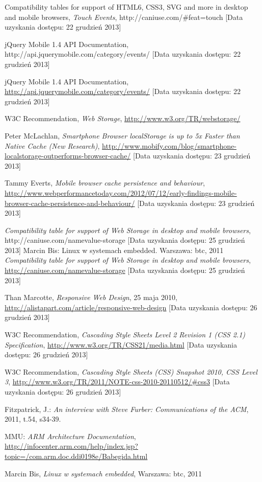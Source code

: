 \begin{thebibliography}{1}
   Compatibility tables for support of HTML6, CSS3, SVG and more in desktop and mobile browsers, {\em Touch Events}, http://caniuse.com/\#feat=touch [Data uzyskania dostępu: 22 grudzień 2013]
  
   jQuery Mobile 1.4 API Documentation, http://api.jquerymobile.com/category/events/ [Data uzyskania dostępu: 22 grudzień 2013]
  
   jQuery Mobile 1.4 API Documentation, \url{http://api.jquerymobile.com/category/events/} [Data uzyskania dostępu: 22 grudzień 2013]
  
   W3C Recommendation, {\em Web Storage}, \url{http://www.w3.org/TR/webstorage/}
  
   Peter McLachlan, \emph{Smartphone Browser localStorage is up to 5x Faster than Native Cache (New Research)}, \url{http://www.mobify.com/blog/smartphone-localstorage-outperforms-browser-cache/} [Data uzyskania dostępu: 23 grudzień 2013]

   Tammy Everts, \emph{Mobile browser cache persistence and behaviour}, \url{http://www.webperformancetoday.com/2012/07/12/early-findings-mobile-browser-cache-persistence-and-behaviour/} [Data uzyskania dostępu: 23 grudzień 2013]

   \emph{Compatibility table for support of Web Storage in desktop and mobile browsers}, http://caniuse.com/namevalue-storage [Data uzyskania dostępu: 25 grudzień 2013]
  Marcin Bis: Linux w systemach embedded. Warszawa: btc, 2011
   \emph{Compatibility table for support of Web Storage in desktop and mobile browsers}, \url{http://caniuse.com/namevalue-storage} [Data uzyskania dostępu: 25 grudzień 2013]
  
   Than Marcotte, \emph{Responsive Web Design}, 25 maja 2010, \url{http://alistapart.com/article/responsive-web-design} [Data uzyskania dostępu: 26 grudzień 2013]

   W3C Recommendation, \emph{Cascading Style Sheets Level 2 Revision 1 (CSS 2.1) Specification}, \url{http://www.w3.org/TR/CSS21/media.html} [Data uzyskania dostępu: 26 grudzień 2013]

   W3C Recommendation, \emph{Cascading Style Sheets (CSS) Snapshot 2010, CSS Level 3}, \url{http://www.w3.org/TR/2011/NOTE-css-2010-20110512/\#css3} [Data uzyskania dostępu: 26 grudzień 2013]

  Fitzpatrick, J.: \emph{An interview with Steve Furber: Communications of the ACM}, 2011, t.54, s34-39.
  
  MMU: \emph{ARM Architecture Documentation}, \url{http://infocenter.arm.com/help/index.jsp?topic=/com.arm.doc.ddi0198e/Babegida.html}

  Marcin Bis, \emph{Linux w systemach embedded}, Warszawa: btc, 2011

\end{thebibliography}
\listoftables

\listoffigures











